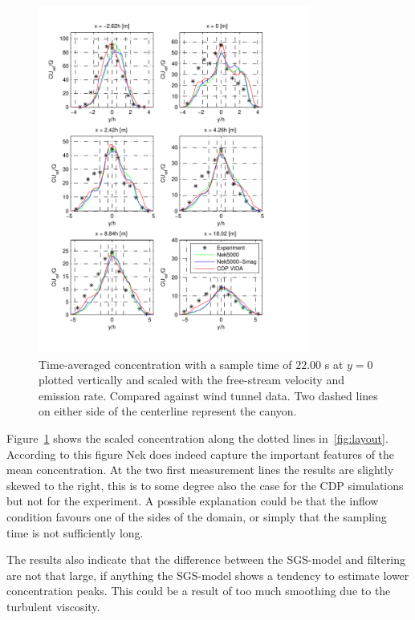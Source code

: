 \begin{figure}[h]
    \centering
    \includegraphics[width=0.8\textwidth]{Figures/NekcH_all.pdf}
    \caption{Time-averaged concentration with a sample time of $22.00$ s at $y = 0$ plotted
    vertically and scaled 
    with the free-stream velocity and emission rate. Compared against wind tunnel data.
Two dashed lines on either side of the centerline represent the canyon.}
    \label{fig:cHall}
\end{figure}

Figure~\ref{fig:cHall} shows the scaled concentration along the dotted lines in~\ref{fig:layout}. 
According to this figure Nek does indeed capture the important features of the mean concentration.
At the two first measurement lines the results are slightly skewed to the right, this is to some degree 
also the case for the CDP simulations but not for the experiment. A possible explanation could be that 
the inflow condition favours one of the sides of the domain, or simply that the sampling time is not 
sufficiently long. 

The results also indicate that the difference between the SGS-model and filtering are not that large,
if anything the SGS-model shows a tendency to estimate lower concentration peaks. This could be a 
result of too much smoothing due to the turbulent viscosity.

